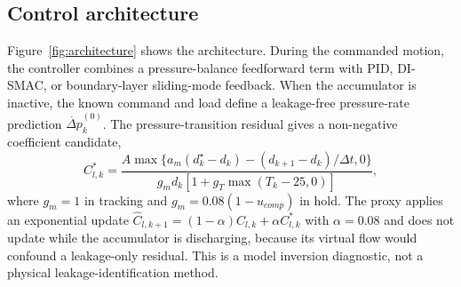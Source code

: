 \documentclass[agriengineering,article,submit,moreauthors]{Definitions/mdpi}
\begin{document}
\begin{table}[H]
\centering
\caption{Selected virtual-prototype inputs and one-at-a-time stress settings. Full provenance and all nominal values are in \texttt{paper1\_parameter\_manifest.csv}; none is an identified physical measurement.}
\label{tab:assumptions}
\end{table}

\subsection{Control architecture}
Figure~\ref{fig:architecture} shows the architecture. During the commanded motion, the controller combines a pressure-balance feedforward term with PID, DI-SMAC, or boundary-layer sliding-mode feedback. When the accumulator is inactive, the known command and load define a leakage-free pressure-rate prediction $\dot{\Delta p}^{(0)}_k$. The pressure-transition residual gives a non-negative coefficient candidate,
\begin{equation}
 C^*_{l,k}=\frac{A\max\{a_m(d_k^\star-d_k)-(d_{k+1}-d_k)/\Delta t,0\}}{g_m d_k[1+g_T\max(T_k-25,0)]},
\end{equation}
where $g_m=1$ in tracking and $g_m=0.08(1-u_{comp})$ in hold. The proxy applies an exponential update $\hat C_{l,k+1}=(1-\alpha)\hat C_{l,k}+\alpha C^*_{l,k}$ with $\alpha=0.08$ and does not update while the accumulator is discharging, because its virtual flow would confound a leakage-only residual. This is a model inversion diagnostic, not a physical leakage-identification method.
\end{document}
